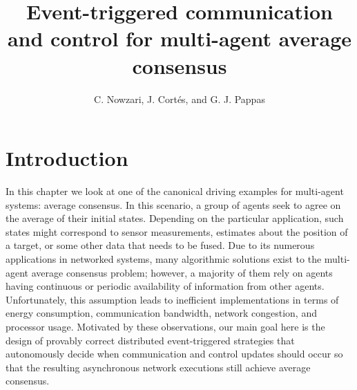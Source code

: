 \documentclass[]{book}
\author{C. Nowzari, J. Cort\'es, and G. J. Pappas}
\title{Event-triggered communication and control for multi-agent average consensus}
\begin{document}
\frontmatter
%
%
\mainmatter

\section{Introduction}\label{se:intro}


In this chapter we look at one of the canonical driving examples for
multi-agent systems: average consensus. In this scenario, a group of
agents seek to agree on the average of their initial states. Depending
on the particular application, such states might correspond to sensor
measurements, estimates about the position of a target, or some other
data that needs to be fused.  Due to its numerous applications in
networked systems, many algorithmic solutions exist to the multi-agent
average consensus problem; however, a majority of them rely on agents
having continuous or periodic availability of information from other
agents.  Unfortunately, this assumption leads to inefficient
implementations in terms of energy consumption, communication
bandwidth, network congestion, and processor usage.  Motivated by
these observations, our main goal here is the design of provably
correct distributed event-triggered strategies that autonomously decide when
communication and control updates should occur so that the resulting
asynchronous network executions still achieve average consensus.
\end{document}
